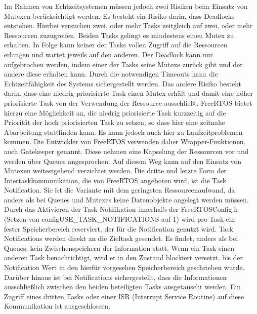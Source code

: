 Im Rahmen von Echtzeitsystemen müssen jedoch zwei Risiken beim Einsatz von Mutexen berücksichtigt werden. Es besteht ein Risiko darin, dass Deadlocks entstehen. Hierbei versuchen zwei, oder mehr Tasks zeitgleich auf zwei, oder mehr Ressourcen zuzugreifen. Beiden Tasks gelingt es mindestens einen Mutex zu erhalten. In Folge kann keiner der Tasks vollen Zugriff auf die Ressourcen erlangen und wartet jeweils auf den anderen. Der Deadlock kann nur aufgebrochen werden, indem einer der Tasks seine Mutexe zurück gibt und der andere diese erhalten kann. 
Durch die notwendigen Timeouts kann die Echt\-zeit\-fähig\-keit des Systems sichergestellt werden. Das andere Risiko besteht darin, dass eine niedrig priorisierte Task einen Mutex erhält und damit eine höher priorisierte Task von der Verwendung der Ressource ausschließt. FreeRTOS bietet hierzu eine Möglichkeit an, die niedrig priorisierte Task kurzzeitig auf die Priorität der hoch priorisierten Task zu setzen, so dass hier eine zeitnahe Abarbeitung stattfinden kann. Es kann jedoch auch hier zu Laufzeitproblemen kommen. 
Die Entwickler von FreeRTOS verwenden daher Wrapper-Funktionen, auch Gatekeeper genannt. Diese nehmen eine Kapselung der Ressourcen vor und werden über Queues angesprochen. Auf diesem Weg kann auf den Einsatz von Mutexen weitestgehend verzichtet werden.
Die dritte und letzte Form der Intertaskkommunikation, die von FreeRTOS angeboten wird, ist die Task Notification. Sie ist die Variante mit dem geringsten Ressourcenaufwand, da anders als bei Queues und Mutexes keine Datenobjekte angelegt werden müssen. Durch das Aktivieren der Task Notifikation innerhalb der FreeRTOSConfig.h (Setzen von configUSE\_TASK\_NOTIFICATIONS auf 1) wird pro Task ein fester Speicherbereich reserviert, der für die Notification genutzt wird. Task Notifications werden direkt an die Zieltask gesendet. Es findet, anders als bei Queues, kein Zwischenspeichern der Information statt. Wenn ein Task einen anderen Task benachrichtigt, wird er in den Zustand blockiert versetzt, bis der Notification Wert in den hierfür vorgesehen Speicherbereich geschrieben wurde. Darüber hinaus ist bei Notifications sichergestellt, dass die Informationen ausschließlich zwischen den beiden beteiligten Tasks ausgetauscht werden. Ein Zugriff eines dritten Tasks oder einer ISR (Interrupt Service Routine) auf diese Kommunikation ist ausgeschlossen.
